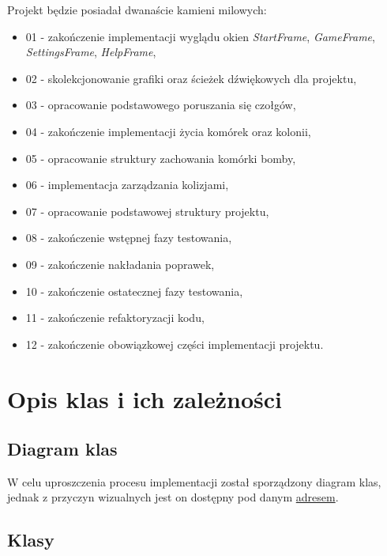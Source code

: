\documentclass[a4paper]{article}
\begin{document}
Projekt b\k{e}dzie posiada\l{} dwana\'scie kamieni milowych: 

    
\begin{itemize}
    \item 01 - zako\'nczenie implementacji wygl\k{a}du okien \textit{StartFrame}, \textit{GameFrame}, \textit{SettingsFrame}, \textit{HelpFrame},
    \item 02 - skolekcjonowanie grafiki oraz \'scie\.zek d\'zwi\k{e}kowych dla projektu,
    \item 03 - opracowanie podstawowego poruszania si\k{e} czo\l{}g\'ow,
    \item 04 - zako\'nczenie implementacji \.zycia kom\'orek oraz kolonii,
    \item 05 - opracowanie struktury zachowania kom\'orki bomby,
    \item 06 - implementacja zarz\k{a}dzania kolizjami,
    \item 07 - opracowanie podstawowej struktury projektu,
    \item 08 - zako\'nczenie wst\k{e}pnej fazy testowania,
    \item 09 - zako\'nczenie nak\l{}adania poprawek,
    \item 10 - zako\'nczenie ostatecznej fazy testowania,
    \item 11 - zako\'nczenie refaktoryzacji kodu,
    \item 12 - zako\'nczenie obowi\k{a}zkowej cz\k{e}\'sci implementacji projektu.
    
\end{itemize}

\section{Opis klas i ich zależności}

\subsection{Diagram klas}

\quad W celu uproszczenia procesu implementacji zosta\l{} sporz\k{a}dzony diagram klas, jednak z przyczyn wizualnych jest on dost\k{e}pny pod danym
\href{https://drive.google.com/file/d/1yqUE8LddMVll-GYRUga39RELv98kOB-G/view?usp=sharing}{adresem}.

\subsection{Klasy}
\end{document}
